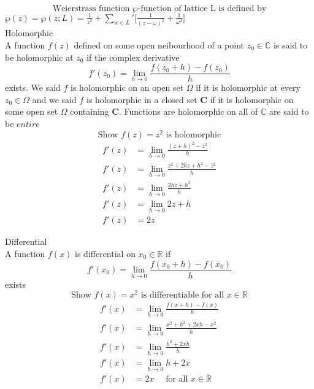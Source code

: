 \documentclass{book}
\begin{document}
\noindent
\[\text{Weierstrass function } \wp \text{-function of lattice L is defined by} \]
$\wp(z) = \wp(z; L) = \frac{1}{z^2} + \sum_{w \in L}' \big[ \frac{1}{(z-\omega)^2} + \frac{1}{\omega^2} \big]$\\

\noindent
Holomorphic\\
A function $f(z)$ defined on some open neibourhood of a point $z_{0} \in \mathbb{C}$ is said to be holomorphic at $z_{0}$ if the complex derivative 
\[ f'(z_{0}) = \lim_{h \to 0 } \frac{f(z_{0} + h) - f(z_{0})}{h} \] exists.
We said $f$ is holomorphic on an open set $\Omega$ if it is holomorphic at every $z_{0} \in \Omega$ and we said $f$ is holomorphic in a closed set $\mathbf{C}$ if it is holomorphic on some open set $\Omega$ containing $\mathbf{C}$.
Functions are holomorphic on all of $\mathbb{C}$ are said to be $\mathit{entire}$\\

\noindent
\[ \text{Show } f(z) = z^2 \text{ is holomorphic} \]
\begin{equation}
\begin{aligned}
f'(z) &= \lim_{h \to 0} \frac{(z+h)^2 - z^2}{h} \\
f'(z) &= \lim_{h \to 0} \frac{z^2 + 2hz + h^2 - z^2}{h}\\
f'(z) &= \lim_{h \to 0} \frac{2hz + h^2}{h} \nonumber \\
f'(z) &= \lim_{h \to 0} 2z + h\\
f'(z) &= 2z
\end{aligned}
\end{equation}

\pagebreak
\noindent
Differential\\
A function $f(x)$ is differential on $x_{0} \in \mathbb{R}$ if \\
\[  f'(x_{0}) =  \lim_{h \to 0} \frac{f(x_{0} +h) - f(x_{0})}{h} \]
exists\\

\[\text{Show } f(x) = x^{2} \text{ is differentiable for all } x  \in \mathbb{R} \]
\begin{equation}
\begin{aligned}
f'(x) &=  \lim_{h \to 0} \frac{f(x +h) - f(x)}{h}\\
f'(x) &= \lim_{h \to 0} \frac{x^2 + h^2 + 2xh - x^2  }{h} \nonumber \\
f'(x) &= \lim_{h \to 0} \frac{h^2 + 2xh}{h}\\
f'(x) &= \lim_{h \to 0} h+2x\\     
f'(x) &= 2x \quad \text{ for all } x \in \mathbb{R}
\end{aligned}
\end{equation}
\end{document}

